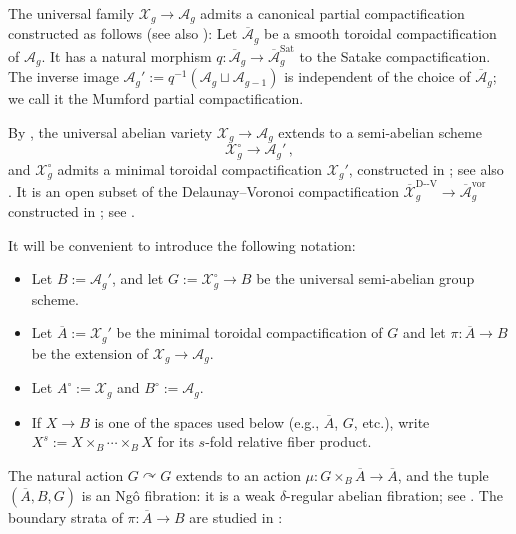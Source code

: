 \documentclass[11pt]{article}
\def\A{\mathcal{A}}
\def\X{\mathcal{X}}
\def\Abar{\overline{\mathcal{A}}}
\def\Xbar{\overline{\mathcal{X}}}
\newcommand{\barA}{\overline{A}}
\theoremstyle{definition}
\begin{document}
The universal family $\X_g \to \A_g$ admits a canonical partial compactification constructed as follows (see also \cite{mumford_kodaira}): Let $\Abar_g$ be a
smooth toroidal compactification of $\A_g$. It has a natural morphism $q : \Abar_g \to \Abar_g^{\mathrm{Sat}}$ to the Satake compactification.
The inverse image $\A_g' := q^{-1}(\A_g \sqcup \A_{g-1})$ is independent of the choice of $\Abar_g$; we call it the Mumford partial compactification.

By \cite{FC}, the universal abelian variety $\X_g \to \A_g$ extends to a semi-abelian scheme
$$
\X_g^{\circ} \to  \A_g'\, ,
$$
and $\X_g^{\circ}$ admits a minimal toroidal compactification $\X_g'$, constructed in \cite{Namikawa,FC}; see also \cite{Alexeev,EdGS}.
It is an open subset of the Delaunay--Voronoi compactification $\Xbar_g^{\operatorname{D--V}} \to \Abar_g^{\operatorname{vor}}$ constructed in \cite{namikawa76}; see \cite{EdGS}.

It will be convenient to introduce the following notation:
\begin{itemize}
    \item Let $B:= \A_g'$, and let $G:= \X_g^\circ \to B$ be the universal semi-abelian group scheme.
	\item Let $\barA:=\X_g'$ be the minimal toroidal compactification of $G$ and let $\pi :\barA \to B$ be the extension of $\X_g\to \A_g$.
	\item Let $A^{\circ}:=\X_g$ and $B^{\circ}:=\mathcal{A}_g$.
    \item If $X\to B$ is one of the spaces used below (e.g., $\barA$, $G$, etc.), write
    $X^s:=X\times_B\cdots\times_BX$ for its $s$-fold relative fiber
    product.
\end{itemize}

The natural action $G\curvearrowright G$ extends to an action $\mu : G\times_B
\barA \to \barA$, and the tuple $(\barA, B, G)$ is an Ng\^o fibration: it is a
weak $\delta$-regular abelian fibration; see \cite[\S 7.1]{Ngo}.
The boundary strata of $\pi :\barA \to B$ are studied in
\cite{mumford_kodaira,EvdG05,GZ}:
\end{document}
